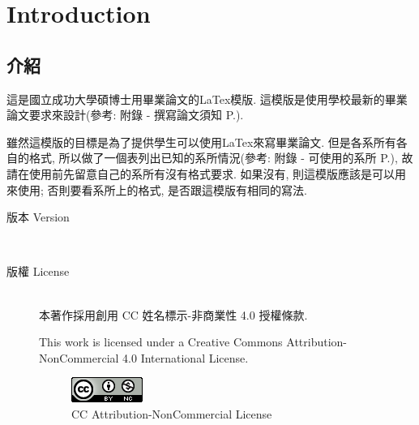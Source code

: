 \chapter{Introduction}
\label{chap:introduction}

\baselineskip=26pt

\section{介紹}

這是國立成功大學碩博士用畢業論文的LaTex模版. 這模版是使用學校最新的畢業論文要求來設計(參考: 附錄 - 撰寫論文須知 P.\pageref{appendix:thesis-spec}).

雖然這模版的目標是為了提供學生可以使用LaTex來寫畢業論文. 但是各系所有各自的格式, 所以做了一個表列出已知的系所情況(參考: 附錄 - 可使用的系所 P.\pageref{appendix:acceptable-dept}), 故請在使用前先留意自己的系所有沒有格式要求. 如果沒有, 則這模版應該是可以用來使用; 否則要看系所上的格式, 是否跟這模版有相同的寫法.

\newpage

\begin{description}
  \item[版本 Version] \hfill \\
    \ThisThesisVersion

  \item[版權 License] \hfill \\
    本著作採用創用 CC 姓名標示-非商業性 4.0 授權條款.

    This work is licensed under a Creative Commons Attribution-NonCommercial 4.0 International License.

    \begin{figure}[h]
    \centering
    \includegraphics[scale=1.0]{./example/introduction/pic/by-nc.png}
    \caption{CC Attribution-NonCommercial License}
    \label{fig:appendix:by-nc}
    \end{figure}
\end{description}

\clearpage

